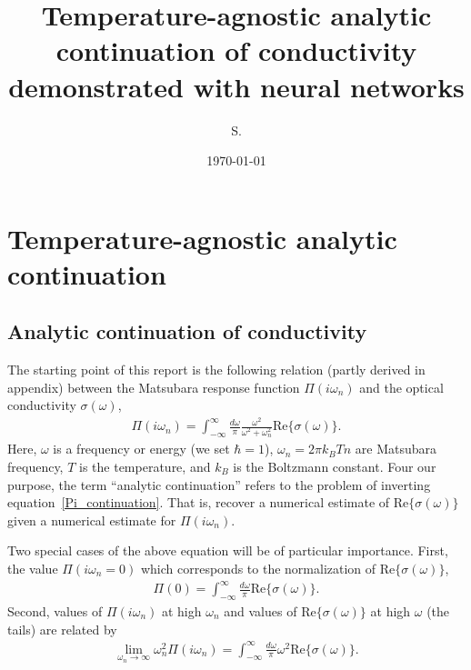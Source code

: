 \documentclass[notitlepage,11pt,nofootinbib]{revtex4-1}
\begin{document}
\title{\bf Temperature-agnostic analytic continuation of conductivity\\demonstrated with neural networks}
\author{S. }
\date{\today}

\begin{abstract}

\end{abstract}

\maketitle
\vspace{-.5cm}
\tableofcontents

\section{Temperature-agnostic analytic continuation}

\subsection{Analytic continuation of conductivity}

The starting point of this report is the following relation (partly derived in appendix) between the Matsubara response function $\Pi(i\omega_n)$ and the optical conductivity $\sigma(\omega)$,
\begin{align}
\Pi(i\omega_n) 
=
\int_{-\infty}^{\infty} \frac{d\omega}{\pi} \frac{\omega^2}{\omega^2+\omega_n^2}
\text{Re}\{ \sigma(\omega) \}.
\label{Pi_continuation}
\end{align}
Here, $\omega$ is a frequency or energy (we set $\hbar=1$), $\omega_n=2\pi k_BTn$ are Matsubara frequency, $T$ is the temperature, and $k_B$ is the Boltzmann constant.
Four our purpose, the term ``analytic continuation'' refers to the problem of inverting equation~\eqref{Pi_continuation}. That is, recover a numerical estimate of $\text{Re}\{ \sigma(\omega) \}$ given a numerical estimate for $\Pi(i\omega_n)$.


Two special cases of the above equation will be of particular importance. First, the value $\Pi(i\omega_n=0)$ which corresponds to the normalization of $\text{Re}\{ \sigma(\omega) \}$,
\begin{align}
\Pi(0) 
=
\int_{-\infty}^{\infty} \frac{d\omega}{\pi}
\text{Re}\{ \sigma(\omega) \}.
\label{Pi_normalization}
\end{align}
Second, values of $\Pi(i\omega_n)$ at high $\omega_n$ and values of $\text{Re}\{ \sigma(\omega) \}$ at high $\omega$ (the tails) are related by
\begin{align}
\lim_{\omega_n\rightarrow\infty}
\omega_n^2
\Pi(i\omega_n)
=
\int_{-\infty}^{\infty} \frac{d\omega}{\pi}\omega^2 
\text{Re}\{ \sigma(\omega) \}.
\label{Pi_moment}
\end{align}
\end{document}
